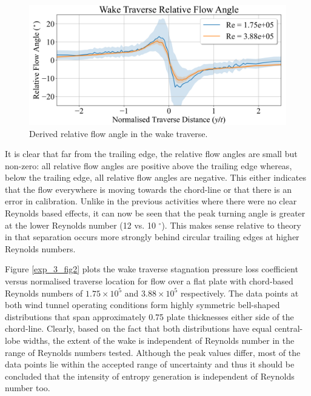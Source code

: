 \documentclass[11pt,a4paper,twocolumn]{article}
\begin{document}
\begin{figure}[!ht]
{\centering
\includegraphics[width = \columnwidth]{exp_3_yaw_measurement.png}
\caption{Derived relative flow angle in the wake traverse.}
\label{exp_3_fig1}}
\end{figure}

It is clear that far from the trailing edge, the relative flow angles are small but non-zero: all relative flow angles are positive above the trailing edge whereas, below the trailing edge, all relative flow angles are negative. This either indicates that the flow everywhere is moving towards the chord-line or that there is an error in calibration. Unlike in the previous activities where there were no clear Reynolds based effects, it can now be seen that the peak turning angle is greater at the lower Reynolds number (12 vs. 10 $^\circ$). This makes sense relative to theory in that separation occurs more strongly behind circular trailing edges at higher Reynolds numbers. 

Figure \ref{exp_3_fig2} plots the wake traverse stagnation pressure loss coefficient versus normalised traverse location for flow over a flat plate with chord-based Reynolds numbers of $1.75 \times 10^5$ and $3.88 \times 10^5$ respectively. The data points at both wind tunnel operating conditions form highly symmetric bell-shaped distributions that span approximately 0.75 plate thicknesses either side of the chord-line. Clearly, based on the fact that both distributions have equal central-lobe widths, the extent of the wake is independent of Reynolds number in the range of Reynolds numbers tested. Although the peak values differ, most of the data points lie within the accepted range of uncertainty and thus it should be concluded that the intensity of entropy generation is independent of Reynolds number too. 
\end{document}
